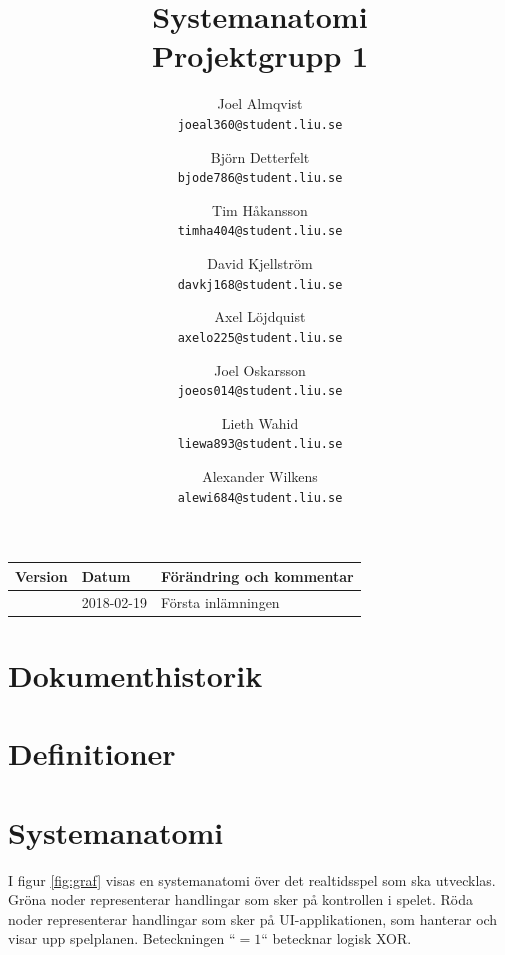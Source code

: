 \documentclass[10pt]{article}
\title{Systemanatomi\\
    \large Projektgrupp 1}
\author{
    Joel Almqvist\\
    \texttt{joeal360@student.liu.se}
    \and
    Björn Detterfelt\\
    \texttt{bjode786@student.liu.se}
    \and
    Tim Håkansson\\
    \texttt{timha404@student.liu.se}
    \and
    David Kjellström\\
    \texttt{davkj168@student.liu.se}
    \and
    Axel Löjdquist\\
    \texttt{axelo225@student.liu.se}
    \and
    Joel Oskarsson\\
    \texttt{joeos014@student.liu.se}
    \and
    Lieth Wahid\\
    \texttt{liewa893@student.liu.se}
    \and
    Alexander Wilkens\\
    \texttt{alewi684@student.liu.se}
}
\newcommand{\History}[3]{
	\centering #1 & #2 & #3 \\ \hline
}
\begin{document}
	\maketitle

  \begin{center}
    \begin{tabular}{| l | l | p{12cm} |}
      \hline
      \textbf{Version} & \textbf{Datum} & \textbf{Förändring och kommentar} \\ \hline
      \History{1.0}{2018-02-19}{Första inlämningen}
    \end{tabular}
  \end{center}

  \pagebreak
  \section*{Dokumenthistorik}


	\tableofcontents

	\pagebreak

	\section{Definitioner}
  \begin{itemize}[leftmargin=5cm]
	\end{itemize}

	\section{Systemanatomi}
		I figur \ref{fig:graf} visas en systemanatomi över det realtidsspel som ska utvecklas. Gröna noder representerar handlingar som sker på kontrollen i spelet. Röda noder representerar handlingar som sker på UI-applikationen, som hanterar och visar upp spelplanen. Beteckningen ``$= 1$`` betecknar logisk XOR.\\
\end{document}

